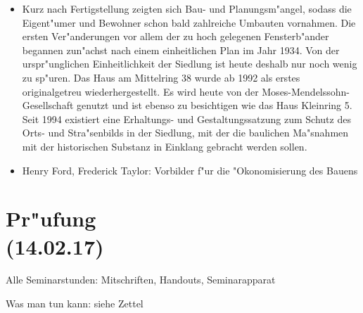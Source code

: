 \documentclass[emulatestandardclasses]{scrartcl}
\begin{document}
\begin{itemize}
  \item Kurz nach Fertigstellung zeigten sich Bau- und Planungsm"angel, sodass die Eigent"umer und Bewohner schon bald zahlreiche Umbauten vornahmen. Die ersten Ver"anderungen vor allem der zu hoch gelegenen Fensterb"ander begannen zun"achst nach einem einheitlichen Plan im Jahr 1934. Von der urspr"unglichen Einheitlichkeit der Siedlung ist heute deshalb nur noch wenig zu sp"uren. Das Haus am Mittelring 38 wurde ab 1992 als erstes originalgetreu wiederhergestellt. Es wird heute von der Moses-Mendelssohn-Gesellschaft genutzt und ist ebenso zu besichtigen wie das Haus Kleinring 5. Seit 1994 existiert eine Erhaltungs- und Gestaltungssatzung zum Schutz des Orts- und Stra"senbilds in der Siedlung, mit der die baulichen Ma"snahmen mit der historischen Substanz in Einklang gebracht werden sollen.
  \item Henry Ford, Frederick Taylor: Vorbilder f"ur die "Okonomisierung des Bauens
\end{itemize}




\section{Pr"ufung\\(14.02.17)}

Alle Seminarstunden: Mitschriften, Handouts, Seminarapparat

Was man tun kann: siehe Zettel


%
\end{document}
